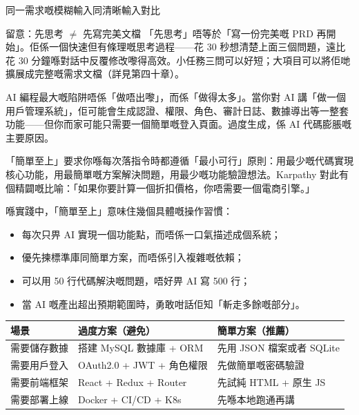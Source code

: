\begin{center}\small\color{gray}同一需求嘅模糊輸入同清晰輸入對比\end{center}

\begin{tcbwarn}{留意：先思考 $\neq$ 先寫完美文檔}
「先思考」唔等於「寫一份完美嘅 PRD 再開始」。佢係一個快速但有條理嘅思考過程——花 30 秒想清楚上面三個問題，遠比花 30 分鐘喺對話中反覆修改嚟得高效。小任務三問可以好短；大項目可以將佢哋擴展成完整嘅需求文檔（詳見第四十章）。

\end{tcbwarn}


AI 編程最大嘅陷阱唔係「做唔出嚟」，而係「做得太多」。當你對 AI 講「做一個用戶管理系統」，佢可能會生成認證、權限、角色、審計日誌、數據導出等一整套功能——但你而家可能只需要一個簡單嘅登入頁面。過度生成，係 AI 代碼膨脹嘅主要原因。

「簡單至上」要求你喺每次落指令時都遵循「最小可行」原則：用最少嘅代碼實現核心功能，用最簡單嘅方案解決問題，用最少嘅功能驗證想法。Karpathy 對此有個精闢嘅比喻：「如果你要計算一個折扣價格，你唔需要一個電商引擎。」

喺實踐中，「簡單至上」意味住幾個具體嘅操作習慣：

\begin{itemize}
  \item 每次只畀 AI 實現一個功能點，而唔係一口氣描述成個系統；
  \item 優先揀標準庫同簡單方案，而唔係引入複雜嘅依賴；
  \item 可以用 50 行代碼解決嘅問題，唔好畀 AI 寫 500 行；
  \item 當 AI 嘅產出超出預期範圍時，勇敢咁話佢知「斬走多餘嘅部分」。
\end{itemize}

\begin{center}
\begin{tabularx}{\linewidth}{|X|X|X|}
\hline
\textbf{場景} & \textbf{過度方案（避免）} & \textbf{簡單方案（推薦）} \tabularnewline
\hline
需要儲存數據 & 搭建 MySQL 數據庫 + ORM & 先用 JSON 檔案或者 SQLite \tabularnewline
需要用戶登入 & OAuth2.0 + JWT + 角色權限 & 先做簡單嘅密碼驗證 \tabularnewline
需要前端框架 & React + Redux + Router & 先試純 HTML + 原生 JS \tabularnewline
需要部署上線 & Docker + CI/CD + K8s & 先喺本地跑通再講 \tabularnewline
\hline
\end{tabularx}
\end{center}

